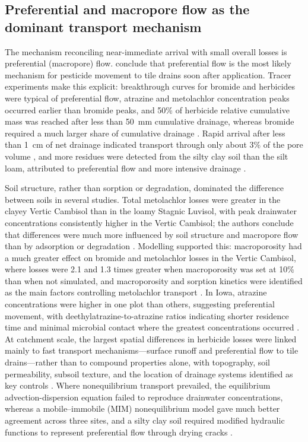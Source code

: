 \subsection{Preferential and macropore flow as the dominant transport mechanism}
The mechanism reconciling near-immediate arrival with small overall losses is preferential (macropore) flow. \textcite{Kladivko2001} conclude that preferential flow is the most likely mechanism for pesticide movement to tile drains soon after application. Tracer experiments make this explicit: breakthrough curves for bromide and herbicides were typical of preferential flow, atrazine and metolachlor concentration peaks occurred earlier than bromide peaks, and 50\% of herbicide relative cumulative mass was reached after less than 50~mm cumulative drainage, whereas bromide required a much larger share of cumulative drainage \parencite{Fortin2002}. Rapid arrival after less than 1~cm of net drainage indicated transport through only about 3\% of the pore volume \parencite{Dousset2004}, and more residues were detected from the silty clay soil than the silt loam, attributed to preferential flow and more intensive drainage \parencite{Dousset2004}.

Soil structure, rather than sorption or degradation, dominated the difference between soils in several studies. Total metolachlor losses were greater in the clayey Vertic Cambisol than in the loamy Stagnic Luvisol, with peak drainwater concentrations consistently higher in the Vertic Cambisol; the authors conclude that differences were much more influenced by soil structure and macropore flow than by adsorption or degradation \parencite{Novak2001}. Modelling supported this: macroporosity had a much greater effect on bromide and metolachlor losses in the Vertic Cambisol, where losses were 2.1 and 1.3 times greater when macroporosity was set at 10\% than when not simulated, and macroporosity and sorption kinetics were identified as the main factors controlling metolachlor transport \parencite{Novak2003}. In Iowa, atrazine concentrations were higher in one plot than others, suggesting preferential movement, with deethylatrazine-to-atrazine ratios indicating shorter residence time and minimal microbial contact where the greatest concentrations occurred \parencite{JAYACHANDRAN1994}. At catchment scale, the largest spatial differences in herbicide losses were linked mainly to fast transport mechanisms---surface runoff and preferential flow to tile drains---rather than to compound properties alone, with topography, soil permeability, subsoil texture, and the location of drainage systems identified as key controls \parencite{Leu2004}. Where nonequilibrium transport prevailed, the equilibrium advection-dispersion equation failed to reproduce drainwater concentrations, whereas a mobile--immobile (MIM) nonequilibrium model gave much better agreement across three sites, and a silty clay soil required modified hydraulic functions to represent preferential flow through drying cracks \parencite{Boivin2006}.

